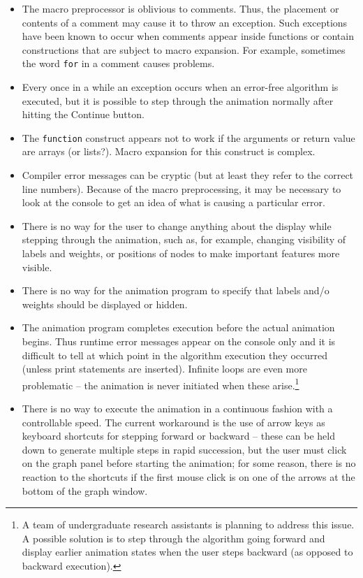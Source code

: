 \begin{itemize}

\item
The macro preprocessor is oblivious to comments. Thus, the placement or contents of a comment may cause it to throw an exception.
Such exceptions have been known to occur when comments appear inside functions
or contain constructions that are subject to macro expansion.
For example, sometimes the word \texttt{for} in a comment causes problems.

\item
  Every once in a while an exception occurs when an error-free algorithm
  is executed, but it is possible to step through the animation normally
  after hitting the \textsf{Continue} button.

\item 
  The \texttt{function} construct appears not to work if the arguments or
  return value are arrays (or lists?).
  Macro expansion for this construct is complex.

\item
Compiler error messages can be cryptic (but at least they refer to the correct
line numbers). Because of the macro preprocessing, it may be necessary to look at the console to get an idea of what is causing a particular error.

\item
There is no way for the user to change anything about the display while stepping through the animation, such as, for example, changing visibility of labels and weights,
or positions of nodes to make important features more visible.

\item
There is no way for the animation program to specify that labels and/o weights
should be displayed or hidden.

\item
The animation program completes execution before the actual animation begins.
Thus runtime error messages appear on the console only and it is difficult to
tell at which point in the algorithm execution they occurred (unless print statements are inserted).
Infinite loops are even more problematic -- the animation is never initiated
when these arise.\footnote{
A team of undergraduate research assistants is planning to address this issue.
A possible solution is to step through the algorithm going forward and display
earlier animation states when the user
steps backward (as opposed to backward execution).
} 

\item
There is no way to execute the animation in a continuous fashion with a
controllable speed. The current workaround is the use of arrow keys as keyboard
shortcuts for stepping forward or backward -- these can be held down to
generate multiple steps in rapid succession, but the user must click on the
graph panel before starting the animation; for some reason, there is no
reaction to the shortcuts if the first mouse click is on one of the arrows at the bottom of the graph window.


\end{itemize}
